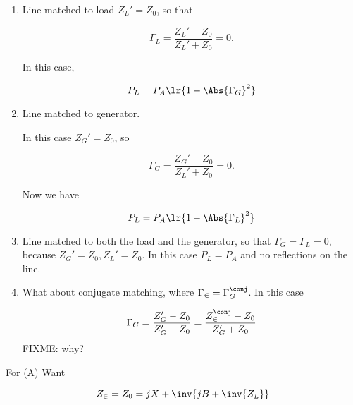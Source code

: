 \begin{enumerate}
\item Line matched to load \( Z_L' = Z_0 \), so that

\begin{dmath}\label{eqn:uwavesDeck6LCmatchingCore:n}
\Gamma_L 
= \frac{Z_L' - Z_0}{Z_L' + Z_0}
= 0.
\end{dmath}

In this case, 

\begin{dmath}\label{eqn:uwavesDeck6LCmatchingCore:n}
P_L = P_A \lr{ 1 - \Abs{\Gamma_G}^2 }
\end{dmath}

\item Line matched to generator.

In this case \( Z_G' = Z_0 \), so

\begin{dmath}\label{eqn:uwavesDeck6LCmatchingCore:n}
\Gamma_G 
= \frac{Z_G' - Z_0}{Z_L' + Z_0}
= 0.
\end{dmath}

Now we have

\begin{dmath}\label{eqn:uwavesDeck6LCmatchingCore:n}
P_L = P_A \lr{ 1 - \Abs{\Gamma_L}^2 }
\end{dmath}

\item Line matched to both the load and the generator, so that \( \Gamma_G = \Gamma_L = 0 \), because \( Z_G' = Z_0, Z_L' = Z_0 \).  In this case \( P_L = P_A \) and no reflections on the line.

\item What about conjugate matching, where \( \Gamma_\in = \Gamma_G^\conj \).  In this case

\begin{dmath}\label{eqn:uwavesDeck6LCmatchingCore:n}
\Gamma_G 
= \frac{Z_G' - Z_0}{Z_G' + Z_0}
= \frac{Z_\in^\conj - Z_0}{Z_G' + Z_0}
\end{dmath}
FIXME: why?

\end{enumerate}


For (A)
Want 

\begin{equation}\label{eqn:uwavesDeck6LCmatchingCore:n}
Z_\in = Z_0 = j X + \inv{ j B + \inv{Z_L} }
\end{equation}


